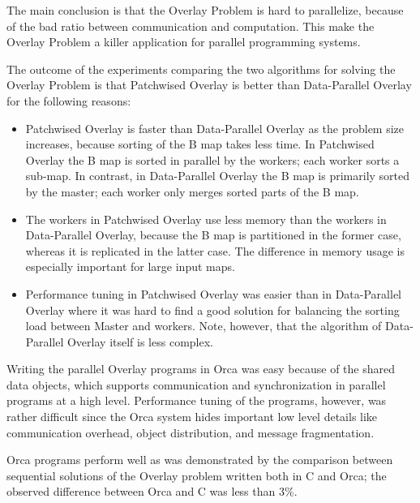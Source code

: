 
The main conclusion is that the Overlay Problem is hard to parallelize,
because of the bad ratio between communication and computation.
This make the Overlay Problem a killer application for parallel
programming systems.

The outcome of the experiments comparing the two algorithms for solving the
Overlay Problem is that Patchwised Overlay is better than 
Data-Parallel Overlay for the following reasons:
\begin{itemize}
  \item Patchwised Overlay is faster than Data-Parallel Overlay
  as the problem size increases, because sorting of the B map takes less time.
  In Patchwised Overlay the B map is sorted in parallel
  by the workers; each worker sorts a sub-map.
  In contrast, in Data-Parallel Overlay the B map is primarily
  sorted by the master; each worker only merges sorted parts of the
  B map.

  \item The workers in Patchwised Overlay use less memory than the
  workers in Data-Parallel Overlay, because the B map is partitioned in
  the former case, whereas it is replicated in the latter case. The
  difference in memory usage is especially important for large input
  maps.

  \item Performance tuning in Patchwised Overlay was easier
  than in Data-Parallel Overlay where it was hard to find a
  good solution for balancing the sorting load between Master
  and workers. Note, however, that
  the algorithm of Data-Parallel Overlay itself is less complex.
\end{itemize}

Writing the parallel Overlay programs in Orca was easy because of
the shared data objects, which supports communication and
synchronization in parallel programs at a high level. 
Performance tuning of the programs, however, was rather difficult since the
Orca system hides important low level details like communication
overhead, object distribution, and message fragmentation.

Orca programs perform well as was demonstrated by the comparison
between sequential solutions of the Overlay problem written both in
C and Orca; the observed difference between Orca and C was less than
3\%.
